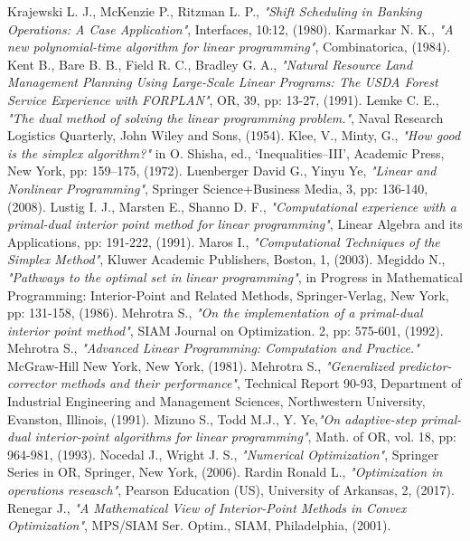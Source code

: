 \documentclass[a4paper,10 pt,titlepage,twoside]{report}
\theoremstyle{plain}
\theoremstyle{definition}
\theoremstyle{remark}
\begin{document}
{{\begin{thebibliography}{9}
		Krajewski L. J., McKenzie P., Ritzman L. P.,\textit{ "Shift Scheduling in Banking Operations: A Case Application"}, Interfaces, 10:12, (1980).
		 Karmarkar N. K.,\emph{ "A new polynomial-time algorithm for linear programming"}, Combinatorica, (1984).
		 Kent B., Bare B. B., Field R. C., Bradley G. A., \textit{"Natural Resource Land Management Planning Using Large-Scale Linear Programs: The USDA Forest Service Experience with FORPLAN"}, OR, 39, pp: 13-27, (1991).
		 Lemke C. E.,\textit{ "The dual method of solving the linear programming problem."}, Naval Research Logistics Quarterly, John Wiley and Sons, (1954).
		 Klee, V., Minty, G.,\emph{ "How good is the simplex algorithm?"} in O. Shisha, ed., ‘Inequalities–III’, Academic Press, New York, pp: 159–175, (1972).
		Luenberger David G., Yinyu Ye, \emph{"Linear and Nonlinear Programming"}, Springer Science+Business Media, 3, pp: 136-140, (2008).
		 Lustig I. J., Marsten E., Shanno D. F.,\emph{ "Computational experience with a primal-dual interior point method for linear programming"}, Linear Algebra and its Applications, pp: 191-222, (1991).
		 Maros I., \emph{"Computational Techniques of the Simplex Method"}, Kluwer
		Academic Publishers, Boston, 1, (2003).
		 Megiddo N., \emph{"Pathways to the optimal set in linear programming"}, in Progress in Mathematical Programming: Interior-Point and Related Methods, Springer-Verlag, New York, pp: 131-158, (1986).
	 Mehrotra S., \emph{ "On the implementation of a primal-dual interior point method"}, SIAM Journal on Optimization. 2, pp: 575-601, (1992).
	 Mehrotra S., \emph{ "Advanced Linear Programming: Computation and
	Practice." } McGraw-Hill New York, New York, (1981).
 Mehrotra S., \emph{"Generalized predictor-corrector methods and their performance"}, Technical Report 90-93, Department of Industrial Engineering and Management Sciences, Northwestern University, Evanston, Illinois, (1991).
		Mizuno S., Todd M.J., Y. Ye,\emph{\;"On adaptive-step primal-dual interior-point algorithms for linear programming"}, Math. of OR, vol. 18, pp: 964-981, (1993). 
	Nocedal J., Wright J. S., \emph{\;"Numerical Optimization"}, Springer Series in OR, Springer, New York, (2006).
 Rardin Ronald L., \textit{"Optimization in operations reseasch"}, Pearson Education (US), University of Arkansas, 2, (2017).
Renegar J., \textit{ "A Mathematical View of Interior-Point Methods in Convex Optimization"}, MPS/SIAM
Ser. Optim., SIAM, Philadelphia, (2001).


\end{thebibliography}}}
\end{document}
